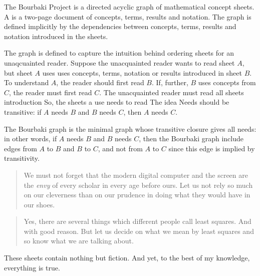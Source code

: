 
The Bourbaki Project is a directed acyclic graph of
mathematical concept sheets.
A  is a two-page document of
concepts, terms, results and notation.
The graph is defined implicitly by
the dependencies between concepts, terms,
results and notation introduced in the sheets.

The graph is defined to capture the intuition
behind ordering sheets for an unaqcuainted reader.
Suppose the unacquainted reader wants to read sheet
$A$, but sheet $A$ uses
uses concepts, terms,
notation or results introduced in sheet $B$.
To understand $A$, the reader should first read $B$.
If, further, $B$ uses concepts from $C$, the reader
must first read $C$.
The unacquainted reader must read all
sheets introduction
So, the sheets a use needs to read
The idea
Needs should be transitive: if $A$ needs
$B$ and $B$ needs $C$, then $A$ needs $C$.


The Bourbaki graph is the minimal graph
whose transitive closure gives all
needs: in other words, if $A$ needs $B$
and $B$ needs $C$, then the Bourbaki
graph include edges from $A$ to $B$ and
$B$ to $C$, and not from $A$ to $C$ since
this edge is implied by transitivity.

\begin{quote}
We must not forget that the
modern digital computer and
the screen are the \textit{envy} of
every scholar in every age
before ours. Let us not rely
so much
on our cleverness
than on our prudence in doing
what they would have in our shoes.
\end{quote}

\begin{quote}
Yes, there are several things
which different people call
least squares. And with good
reason. But let us decide on
what we mean by least squares
and so know what we are talking
about.
\end{quote}

These sheets contain nothing
but fiction. And yet, to the best
of my knowledge, everything
is true.

